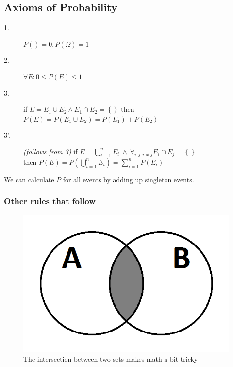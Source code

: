 \subsection{Axioms of Probability}
\begin{description}
	\item[1.] $P({}) = 0, P(\Omega) = 1$
  \item[2.] $\forall E: 0 \leq P(E) \leq 1$
  \item[3.] if $E = E_1 \cup E_2 \wedge E_1 \cap E_2 = \left\{ \right\}$ 
            then $P(E) = P(E_1 \cup E_2) = P(E_1) + P(E_2)$
  \item[3'.] \textit{(follows from 3)} 
            if $E = \bigcup\limits_{i=1}^n E_i \  \wedge \ \forall_{i, j; i \neq j} E_i \cap E_j = \left\{ \right\}$ \\
            then $P(E) = P\left(\bigcup\limits_{i=1}^n E_i\right) = \sum\limits_{i=1}^{n}{P\left(E_i\right)}$
\end{description}

We can calculate $P$ for all events by adding up singleton events.

\subsubsection*{Other rules that follow}
\begin{figure}[ht]
  \begin{center}
    \includegraphics[scale=0.3]{images/venn_diagram_a_intersects_b}
    \caption{The intersection between two sets makes math a bit tricky}
    \label{fig:venn_a_inter_b}
  \end{center}
\end{figure}


